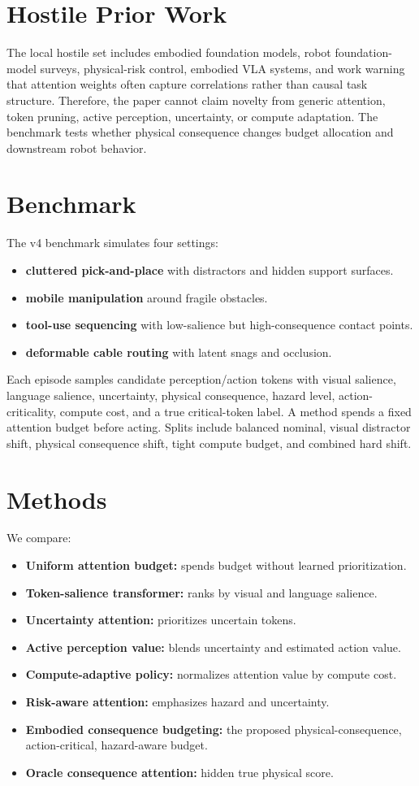 \documentclass{article}
\begin{document}
\section{Hostile Prior Work}
The local hostile set includes embodied foundation models, robot foundation-model surveys, physical-risk control, embodied VLA systems, and work warning that attention weights often capture correlations rather than causal task structure. Therefore, the paper cannot claim novelty from generic attention, token pruning, active perception, uncertainty, or compute adaptation. The benchmark tests whether physical consequence changes budget allocation and downstream robot behavior.

\section{Benchmark}
The v4 benchmark simulates four settings:
\begin{itemize}
\item \textbf{cluttered pick-and-place} with distractors and hidden support surfaces.
\item \textbf{mobile manipulation} around fragile obstacles.
\item \textbf{tool-use sequencing} with low-salience but high-consequence contact points.
\item \textbf{deformable cable routing} with latent snags and occlusion.
\end{itemize}
Each episode samples candidate perception/action tokens with visual salience, language salience, uncertainty, physical consequence, hazard level, action-criticality, compute cost, and a true critical-token label. A method spends a fixed attention budget before acting. Splits include balanced nominal, visual distractor shift, physical consequence shift, tight compute budget, and combined hard shift.

\section{Methods}
We compare:
\begin{itemize}
\item \textbf{Uniform attention budget:} spends budget without learned prioritization.
\item \textbf{Token-salience transformer:} ranks by visual and language salience.
\item \textbf{Uncertainty attention:} prioritizes uncertain tokens.
\item \textbf{Active perception value:} blends uncertainty and estimated action value.
\item \textbf{Compute-adaptive policy:} normalizes attention value by compute cost.
\item \textbf{Risk-aware attention:} emphasizes hazard and uncertainty.
\item \textbf{Embodied consequence budgeting:} the proposed physical-consequence, action-critical, hazard-aware budget.
\item \textbf{Oracle consequence attention:} hidden true physical score.
\end{itemize}
\end{document}
